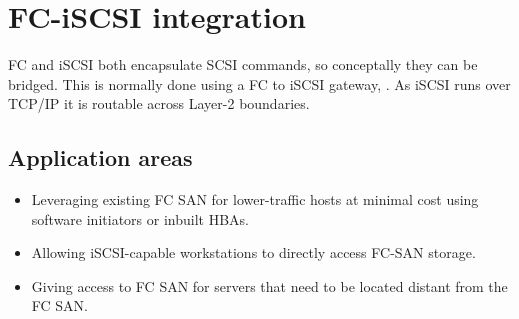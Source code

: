 \section{FC-iSCSI integration}
\label{sec:fc-iscsi-integration}

FC and iSCSI both encapsulate SCSI commands, so conceptally they can be
bridged. This is normally done using a FC to iSCSI gateway, . As iSCSI
runs over TCP/IP it is routable across Layer-2 boundaries.


\subsection{Application areas}
\label{sec:application-areas}

\begin{itemize}
\item
  Leveraging existing FC SAN for lower-traffic hosts at minimal cost
  using software initiators or inbuilt HBAs.
\item
  Allowing iSCSI-capable workstations to directly access FC-SAN storage.
\item
  Giving access to FC SAN for servers that need to be located distant
  from the FC SAN.
\end{itemize}

